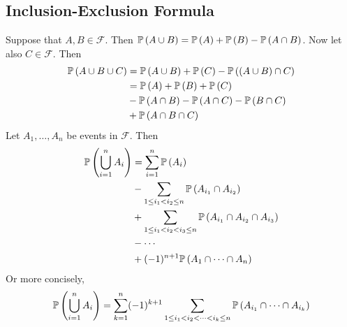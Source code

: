 \documentclass{article}
\begin{document}
\subsection{Inclusion-Exclusion Formula}
Suppose that $A, B \in \mathcal F$. Then $\mathbb{P}\left({A \cup B}\right) = \mathbb{P}\left({A}\right) + \mathbb{P}\left({B}\right) - \mathbb{P}\left({A \cap B}\right)$. Now let also $C \in \mathcal F$. Then
\begin{align*}
    \mathbb{P}\left({A \cup B \cup C}\right) & = \mathbb{P}\left({A \cup B}\right) + \mathbb{P}\left({C}\right) - \mathbb{P}\left({(A \cup B) \cap C}\right) \\
                           & = \mathbb{P}\left({A}\right) + \mathbb{P}\left({B}\right) + \mathbb{P}\left({C}\right)                        \\
                           & - \mathbb{P}\left({A \cap B}\right) - \mathbb{P}\left({A \cap C}\right) - \mathbb{P}\left({B \cap C}\right)   \\
                           & + \mathbb{P}\left({A \cap B \cap C}\right)
\end{align*}
Let $A_1, \dots, A_n$ be events in $\mathcal F$. Then
\begin{align*}
    \mathbb{P}\left({\bigcup_{i=1}^n A_i}\right) & = \sum_{i=1}^n \mathbb{P}\left({A_i}\right)                                                      \\
                               & - \sum_{1 \leq i_1 < i_2 \leq n}\mathbb{P}\left({A_{i_1} \cap A_{i_2}}\right)                    \\
                               & + \sum_{1 \leq i_1 < i_2 < i_3 \leq n}\mathbb{P}\left({A_{i_1} \cap A_{i_2} \cap A_{i_3}}\right) \\
                               & - \cdots                                                                       \\
                               & + (-1)^{n+1}\mathbb{P}\left({A_1 \cap \dots \cap A_n}\right)
\end{align*}
Or more concisely,
\[ \mathbb{P}\left({\bigcup_{i=1}^n A_i}\right) = \sum_{k=1}^n (-1)^{k+1} \sum_{1 \leq i_1 < i_2 < \dots < i_k \leq n} \mathbb{P}\left({A_{i_1} \cap \dots \cap A_{i_k}}\right) \]
\end{document}
